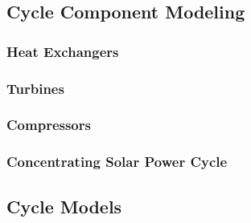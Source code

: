 


\subsection{Cycle Component Modeling}

\subsubsection{Heat Exchangers}
\subsubsection{Turbines}
\subsubsection{Compressors}
\subsubsection{Concentrating Solar Power Cycle}


\subsection{Cycle Models}








